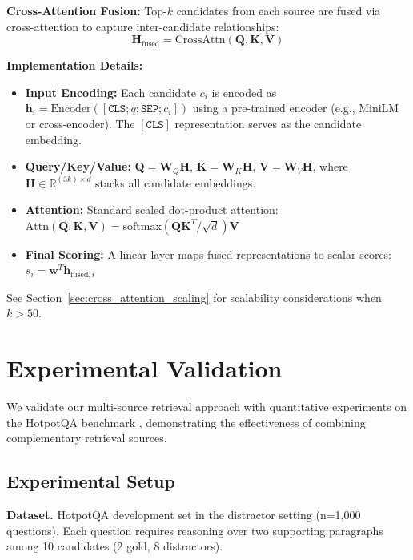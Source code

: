 \documentclass[11pt,a4paper]{article}
\begin{document}
\textbf{Cross-Attention Fusion:} Top-$k$ candidates from each source are fused via cross-attention to capture inter-candidate relationships:
\begin{equation}
\mathbf{H}_{\text{fused}} = \text{CrossAttn}(\mathbf{Q}, \mathbf{K}, \mathbf{V})
\end{equation}

\textbf{Implementation Details:}
\begin{itemize}
    \item \textbf{Input Encoding:} Each candidate $c_i$ is encoded as $\mathbf{h}_i = \text{Encoder}([\texttt{CLS}; q; \texttt{SEP}; c_i])$ using a pre-trained encoder (e.g., MiniLM or cross-encoder). The $[\texttt{CLS}]$ representation serves as the candidate embedding.
    \item \textbf{Query/Key/Value:} $\mathbf{Q} = \mathbf{W}_Q \mathbf{H}$, $\mathbf{K} = \mathbf{W}_K \mathbf{H}$, $\mathbf{V} = \mathbf{W}_V \mathbf{H}$, where $\mathbf{H} \in \mathbb{R}^{(3k) \times d}$ stacks all candidate embeddings.
    \item \textbf{Attention:} Standard scaled dot-product attention: $\text{Attn}(\mathbf{Q}, \mathbf{K}, \mathbf{V}) = \text{softmax}(\mathbf{Q}\mathbf{K}^T / \sqrt{d})\mathbf{V}$
    \item \textbf{Final Scoring:} A linear layer maps fused representations to scalar scores: $s_i = \mathbf{w}^T \mathbf{h}_{\text{fused},i}$
\end{itemize}

See Section~\ref{sec:cross_attention_scaling} for scalability considerations when $k > 50$.

\section{Experimental Validation}
\label{sec:experiments}

We validate our multi-source retrieval approach with quantitative experiments on the HotpotQA benchmark \citep{yang2018hotpotqa}, demonstrating the effectiveness of combining complementary retrieval sources.

\subsection{Experimental Setup}

\textbf{Dataset.} HotpotQA development set in the distractor setting (n=1,000 questions). Each question requires reasoning over two supporting paragraphs among 10 candidates (2 gold, 8 distractors).
\end{document}

